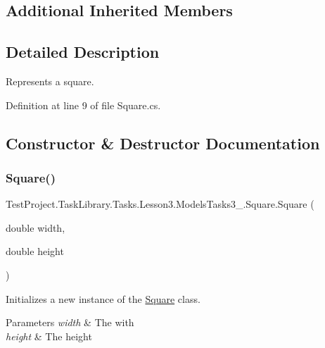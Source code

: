 \subsection*{Additional Inherited Members}


\subsection{Detailed Description}
Represents a square. 



Definition at line 9 of file Square.\+cs.



\subsection{Constructor \& Destructor Documentation}
\mbox{\label{class_test_project_1_1_task_library_1_1_tasks_1_1_lesson3_1_1_models_tasks3__4_1_1_square_a30a3191f966e78a81fccedfedb468d50}} 
\subsubsection{\texorpdfstring{Square()}{Square()}}
{\footnotesize\ttfamily Test\+Project.\+Task\+Library.\+Tasks.\+Lesson3.\+Models\+Tasks3\+\_.\+Square.\+Square (\begin{DoxyParamCaption}\item[{double}]{width,  }\item[{double}]{height }\end{DoxyParamCaption})}



Initializes a new instance of the \mbox{\hyperlink{class_test_project_1_1_task_library_1_1_tasks_1_1_lesson3_1_1_models_tasks3__4_1_1_square}{Square}} class. 


\begin{DoxyParams}{Parameters}
{\em width} & The with\\
\hline
{\em height} & The height\\
\hline
\end{DoxyParams}



